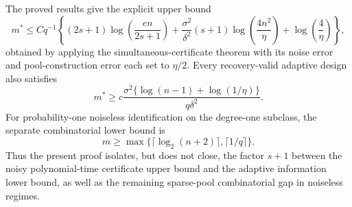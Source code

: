The proved results give the explicit upper bound
\[
 m^*\le Cq^{-1}\left\{(2s+1)\log\!\left(\frac{en}{2s+1}\right)
 +\frac{\sigma^2}{\delta^2}(s+1)\log\!\left(\frac{4n^2}{\eta}\right)
 +\log\!\left(\frac4\eta\right)\right\},
\]
obtained by applying the simultaneous-certificate theorem with its noise error and pool-construction error each set to \(\eta/2\).  Every recovery-valid adaptive design also satisfies
\[
 m^*\ge c\frac{\sigma^2\{\log(n-1)+\log(1/\eta)\}}{q\delta^2}.
\]
For probability-one noiseless identification on the degree-one subclass, the separate combinatorial lower bound is
\[
 m\ge\max\{\lceil\log_2(n+2)\rceil,\lceil1/q\rceil\}.
\]
Thus the present proof isolates, but does not close, the factor \(s+1\) between the noisy polynomial-time certificate upper bound and the adaptive information lower bound, as well as the remaining sparse-pool combinatorial gap in noiseless regimes.